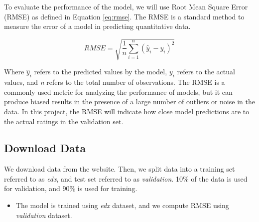 \documentclass[]{article}
\begin{document}
To evaluate the performance of the model, we will use Root Mean Square
Error (RMSE) \cite{rmse} as defined in Equation \ref{eq:rmse}. The RMSE
is a standard method to measure the error of a model in predicting
quantitative data.

\begin{equation}
\label{eq:rmse}
RMSE = \sqrt{\frac{1}{n}\displaystyle\sum_{i=1}^{n} (\hat{y}_{i}-y_{i})^{2}}
\end{equation}

Where \(\hat{y}_{i}\) refers to the predicted values by the model,
\({y}_{i}\) refers to the actual values, and \emph{n} refers to the
total number of observations. The RMSE is a commonly used metric for
analyzing the performance of models, but it can produce biased results
in the presence of a large number of outliers or noise in the data. In
this project, the RMSE will indicate how close model predictions are to
the actual ratings in the validation set.

\subsection{Download Data}
\label{datadownload}

We download data from the website. Then, we split data into a training
set referred to as \emph{edx}, and test set referred to as
\emph{validation}. 10\% of the data is used for validation, and 90\% is
used for training.

\begin{itemize}
\item The model is trained using \emph{edx} dataset, and 
we compute RMSE using \emph{validation} dataset.
\end{itemize}
\end{document}
